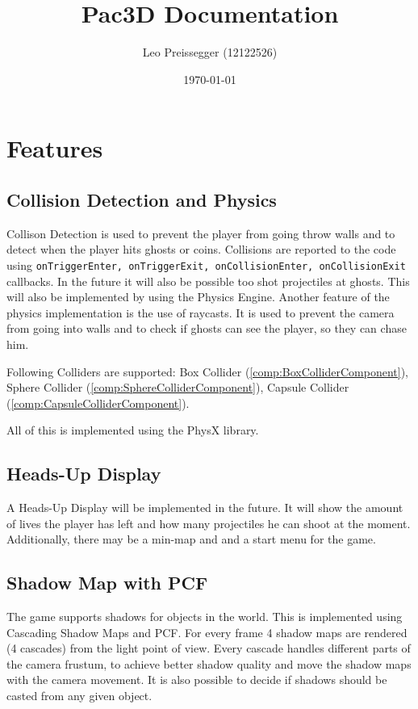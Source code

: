 \documentclass{article}
\title{Pac3D Documentation}
\author{Leo Preissegger (12122526)}
\date{\today}
\begin{document}
\maketitle

\section{Features}

\subsection{Collision Detection and Physics}
\label{sec:physics}

Collison Detection is used to prevent the player from going throw walls and to detect when the player hits ghosts or coins. Collisions are reported to the code using \verb|onTriggerEnter, onTriggerExit, onCollisionEnter, onCollisionExit| callbacks. In the future it will also be possible too shot projectiles at ghosts. This will also be implemented by using the Physics Engine. Another feature of the physics implementation is the use of raycasts. It is used to prevent the camera from going into walls and to check if ghosts can see the player, so they can chase him.

Following Colliders are supported: Box Collider (\ref{comp:BoxColliderComponent}), Sphere Collider (\ref{comp:SphereColliderComponent}), Capsule Collider (\ref{comp:CapsuleColliderComponent}).

All of this is implemented using the PhysX library.

\subsection{Heads-Up Display}

A Heads-Up Display will be implemented in the future. It will show the amount of lives the player has left and how many projectiles he can shoot at the moment. Additionally, there may be a min-map and and a start menu for the game.

\subsection{Shadow Map with PCF}

The game supports shadows for objects in the world. This is implemented using Cascading Shadow Maps and PCF. For every frame 4 shadow maps are rendered (4 cascades) from the light point of view. Every cascade handles different parts of the camera frustum, to achieve better shadow quality and move the shadow maps with the camera movement. It is also possible to decide if shadows should be casted from any given object.
\end{document}

